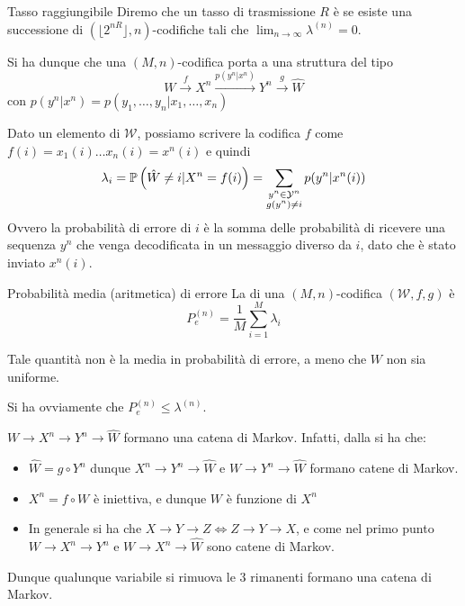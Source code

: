 \begin{definition}{Tasso raggiungibile}
  Diremo che un tasso di trasmissione \(R\) è  se esiste una successione di \((\lfloor 2^{nR} \rfloor, n)\)\nobreakdash-codifiche tali che \(\lim_{n\to\infty} \lambda^{(n)} = 0\).
\end{definition}

Si ha dunque che una \((M,n)\)\nobreakdash-codifica porta a una struttura del tipo
\begin{equation}
  W \xrightarrow{f} X^n \xrightarrow{p(y^n|x^n)} Y^n \xrightarrow{g} \hat{W}
\end{equation}
con \(p(y^n|x^n) = p(y_1,\ldots,y_n|x_1,\ldots,x_n)\)

Dato un elemento di \(\mathcal{W}\), possiamo scrivere la codifica \(f\) come \(f(i) = x_1(i)\ldots x_n(i) = x^n(i)\) e quindi
\[\lambda_i = \Prob[\hat{W} \neq i|X^n = f(i)] = \sum_{\substack{y^n \in \mathcal{Y}^n \\ g(y^n) \neq i}} p(y^n|x^n(i))\]
Ovvero la probabilità di errore di \(i\) è la somma delle probabilità di ricevere una sequenza \(y^n\) che venga decodificata in un messaggio diverso da \(i\), dato che è stato inviato \(x^n(i)\).

\begin{definition}{Probabilità media (aritmetica) di errore}
  La  di una \((M,n)\)\nobreakdash-codifica \((\mathcal{W},f,g)\) è
  \[P_e^{(n)} = \frac{1}{M} \sum_{i=1}^M \lambda_i\]
  
  Tale quantità non è la media in probabilità di errore, a meno che \(W\) non sia uniforme.
  
  Si ha ovviamente che \(P_e^{(n)} \leq \lambda^{(n)}\).
\end{definition}

\begin{observation}{}
  \(W \to X^n \to Y^n \to \hat{W}\) formano una catena di Markov.
  Infatti, dalla  si ha che:
  \begin{itemize}
    \item \(\hat{W} = g \circ Y^n\) dunque \(X^n \to Y^n \to \hat{W}\) e \(W \to Y^n \to \hat{W}\) formano catene di Markov.
    \item \(X^n = f \circ W\) è iniettiva, e dunque \(W\) è funzione di \(X^n\)
    \item In generale si ha che \(X\to Y\to Z \iff Z \to Y \to X\), e come nel primo punto \(W \to X^n \to Y^n\) e \(W \to X^n \to \hat{W}\) sono catene di Markov.
  \end{itemize}
  Dunque qualunque variabile si rimuova le \(3\) rimanenti formano una catena di Markov.
\end{observation}

